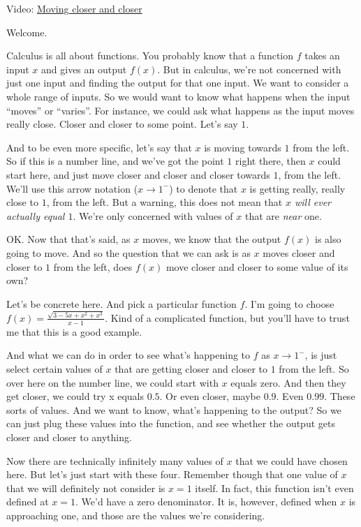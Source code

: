 \documentclass[pdftex, brazil, 12pt, twoside]{article}
\begin{document}
Video: \href{https://www.youtube.com/watch?v=bANtYKLugsU}{Moving closer and closer}

Welcome.

Calculus is all about functions. You probably know that a function $f$ takes an input $x$
and gives an output $f(x)$. But in calculus, we're not concerned with just one input
and finding the output for that one input. We want to consider a whole range of inputs.
So we would want to know what happens when the input ``moves'' or ``varies''.
For instance, we could ask what happens as the input moves really close.
Closer and closer to some point. Let's say $1$.

And to be even more specific, let's say that $x$ is moving towards $1$ from the left.
So if this is a number line, and we've got the point $1$ right there, then $x$
could start here, and just move closer and closer and closer towards $1$, from the left.
We'll use this arrow notation ($x \to 1^{-}$) to denote that $x$ is getting really, really close to $1$,
from the left.
But a warning, this does not mean that \emph{$x$ will ever actually equal $1$}.
We're only concerned with values of $x$ that are \emph{near} one.

OK. Now that that's said, as $x$ moves,
we know that the output $f(x)$ is also going to move.
And so the question that we can ask
is as $x$ moves closer and closer to $1$ from the left,
does $f(x)$ move closer and closer
to some value of its own?

Let's be concrete here.
And pick a particular function $f$.
I'm going to choose $\displaystyle f(x) = \frac{\sqrt{3-5x+x^2+x^3}}{x-1}$.
Kind of a complicated function, but you'll
have to trust me that this is a good example.

And what we can do in order to see what's
happening to $f$ as $x \to 1^{-}$,
is just select certain values of $x$
that are getting closer and closer to $1$ from the left.
So over here on the number line, we
could start with $x$ equals zero.
And then they get closer, we could try x equals $0.5$.
Or even closer, maybe $0.9$.
Even $0.99$.
These sorts of values.
And we want to know, what's happening to the output?
So we can just plug these values into the function,
and see whether the output gets closer and closer to anything.

Now there are technically infinitely many values
of $x$ that we could have chosen here.
But let's just start with these four.
Remember though that one value of $x$
that we will definitely not consider
is $x = 1$ itself.
In fact, this function isn't even defined at $x = 1$.
We'd have a zero denominator.
It is, however, defined when $x$ is approaching one,
and those are the values we're considering.
\end{document}
